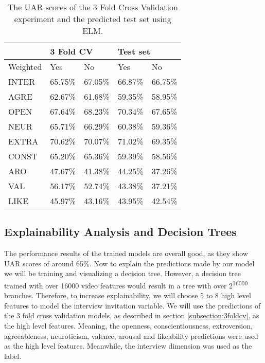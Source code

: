 \begin{table}[h]
\begin{tabular}{|l|r|r|r|r|}
\hline
\rowcolor{Gray}
 & \multicolumn{2}{l|}{3 Fold CV} & \multicolumn{2}{l|}{Test set} \\ \hline
Weighted & \multicolumn{1}{l|}{Yes} & \multicolumn{1}{l|}{No} & \multicolumn{1}{l|}{Yes} & \multicolumn{1}{l|}{No} \\ \hline
INTER & 65.75\% & 67.05\% & 66.87\% & 66.75\% \\ \hline
AGRE & 62.67\% & 61.68\% & 59.35\% & 58.95\% \\ \hline
OPEN & 67.64\% & 68.23\% & 70.34\% & 67.65\% \\ \hline
NEUR & 65.71\% & 66.29\% & 60.38\% & 59.36\% \\ \hline
EXTRA & 70.62\% & 70.07\% & 71.02\% & 69.35\% \\ \hline
CONST & 65.20\% & 65.36\% & 59.39\% & 58.56\% \\ \hline
ARO & 47.67\% & 41.38\% & 44.25\% & 37.26\% \\ \hline
VAL & 56.17\% & 52.74\% & 43.38\% & 37.21\% \\ \hline
LIKE & 45.97\% & 43.16\% & 43.95\% & 42.54\% \\ \hline
\end{tabular}
\caption{The UAR scores of the 3 Fold Cross Validation experiment and the predicted test set using ELM.}
\label{tab:3foldtestuar}
\end{table}

\subsection{Explainability Analysis and Decision Trees}
The performance results of the trained models are overall good, as they show UAR scores of around 65\%. Now to explain the predictions made by our model we will be training and visualizing a decision tree. However, a decision tree trained with over 16000 video features would result in a tree with over 2\textsuperscript{16000} branches. Therefore, to increase explainability, we will choose 5 to 8 high level features to model the interview invitation variable. We will use the predictions of the 3 fold cross validation models, as described in section \ref{subsection:3foldcv}, as the high level features. Meaning, the openness, conscientiousness, extroversion, agreeableness, neuroticism, valence, arousal and likeability predictions were used as the high level features. Meanwhile, the interview dimension was used as the label. 

